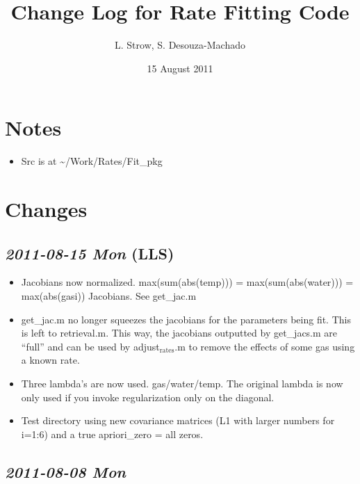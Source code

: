 \documentclass[11pt]{article}
\title{Change Log for Rate Fitting Code}
\author{L. Strow, S. Desouza-Machado}
\date{15 August 2011}
\begin{document}
\maketitle


\section{Notes}
\label{sec-1}


\begin{itemize}
\item Src is at \~{}/Work/Rates/Fit\_pkg
\end{itemize}
\section{Changes}
\label{sec-2}
\subsection{\textit{2011-08-15 Mon} (LLS)}
\label{sec-2_1}


\begin{itemize}
\item Jacobians now normalized.  max(sum(abs(temp))) =
  max(sum(abs(water))) = max(abs(gasi)) Jacobians.  See get\_jac.m
\item get\_jac.m no longer squeezes the jacobians for the parameters being
  fit.  This is left to retrieval.m.  This way, the jacobians
  outputted by get\_jacs.m are ``full'' and can be used by adjust$_{\mathrm{rates}}$.m
  to remove the effects of some gas using a known rate.
\item Three lambda's are now used.  gas/water/temp.  The original lambda
  is now only used if you invoke regularization only on the diagonal.
\item Test directory using new covariance matrices (L1 with larger numbers
  for i=1:6) and a true apriori\_zero = all zeros.
\end{itemize}
\subsection{\textit{2011-08-08 Mon}}
\label{sec-2_2}
\end{document}
